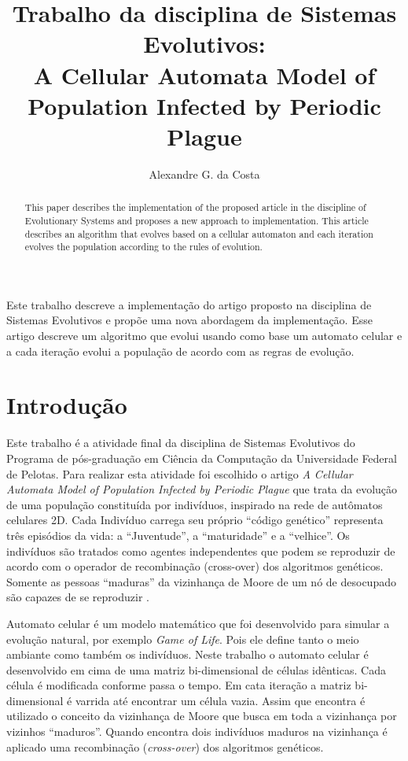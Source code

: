 \documentclass[12pt]{article}
\title{Trabalho da disciplina de Sistemas Evolutivos:\\ A Cellular Automata
 Model of Population Infected by Periodic Plague}
\author{Alexandre G. da Costa\inst{1}}
\begin{document}
 

\maketitle

\begin{abstract}
  This paper describes the implementation of the proposed article in the
  discipline of Evolutionary Systems and proposes a new approach to
  implementation. This article describes an algorithm that evolves based on
  a cellular automaton and each iteration evolves the population according to
  the rules of evolution.
\end{abstract}
  
\begin{resumo} 
  Este trabalho descreve a implementação do artigo proposto na disciplina de
  Sistemas Evolutivos e propõe uma nova abordagem da implementação. Esse
  artigo descreve um algoritmo que evolui usando como base um automato 
  celular e a cada iteração evolui a população de acordo com as regras de
  evolução.
\end{resumo}

\section{Introdução}

Este trabalho é a atividade final da disciplina de Sistemas Evolutivos do
Programa de pós-graduação em Ciência da Computação da Universidade Federal de
Pelotas. Para realizar esta atividade foi escolhido o artigo \textit{A
Cellular Automata Model of Population Infected by Periodic Plague} que trata
da evolução de uma população constituída por indivíduos, inspirado na rede de
autômatos celulares 2D. Cada Indivíduo carrega seu próprio ``código genético''
representa três episódios da vida: a ``Juventude'', a ``maturidade'' e
a ``velhice''. Os indivíduos são tratados como agentes independentes que podem
se reproduzir de acordo com o operador de recombinação (cross-over) dos
algoritmos genéticos. Somente as pessoas ``maduras'' da vizinhança de Moore de
um nó de desocupado são capazes de se reproduzir \cite{dzwinel:04}.

Automato celular é um modelo matemático que foi desenvolvido para simular a
evolução natural, por exemplo \textit{Game of Life}. Pois ele define tanto o
meio ambiante como também os indivíduos. Neste trabalho o automato celular é
desenvolvido em cima de uma matriz bi-dimensional de células idênticas. Cada
célula é modificada conforme passa o tempo. Em cata iteração a matriz
bi-dimensional é varrida até encontrar um célula vazia. Assim que encontra é
utilizado o conceito da vizinhança de Moore que busca em toda a vizinhança por
vizinhos ``maduros''. Quando encontra dois indivíduos maduros na vizinhança é
aplicado uma recombinação (\textit{cross-over}) dos algoritmos genéticos.
\end{document}
